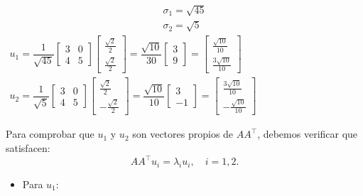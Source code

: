 \begin{enumerate}[label=\color{red}\textbf{\arabic*)}]
\begin{enumerate}[label=\color{red}\textbf{\alph*)}]
        \[
        \begin{array}{l}
            \sigma_1=\sqrt{45}\\
            \sigma_2=\sqrt{5} 
        \end{array}
        \] 
        $\begin{array}{l}
            u_1=\dfrac{1}{\sqrt{45} }\begin{bmatrix} 
                3 & 0\\
                4 & 5
            \end{bmatrix} \begin{bmatrix} 
            \tfrac{\sqrt{2} }{2} \\ \tfrac{\sqrt{2} }{2}  
            \end{bmatrix} =\dfrac{\sqrt{10} }{30}\begin{bmatrix} 
            3\\9 
            \end{bmatrix} =\begin{bmatrix} 
            \tfrac{\sqrt{10} }{10} \\ \tfrac{3\sqrt{10} }{10}
            \end{bmatrix}\\
            u_2=\dfrac{1}{\sqrt{5} }\begin{bmatrix} 
                3 & 0\\ 4 & 5 
            \end{bmatrix} \begin{bmatrix} 
            \tfrac{\sqrt{2} }{2}\\ -\tfrac{\sqrt{2}}{2}   
            \end{bmatrix} =\dfrac{\sqrt{10} }{10}\begin{bmatrix} 
            3\\-1 
            \end{bmatrix} =\begin{bmatrix} 
            \tfrac{3\sqrt{10} }{10}\\ -\tfrac{\sqrt{10} }{10} 
            \end{bmatrix} 
        \end{array}$


    Para comprobar que $u_1$ y $u_2$ son vectores propios de $A A^\intercal$, debemos verificar que satisfacen: \[
    A A^\intercal u_i=\lambda_iu_i,\quad i=1,2.
    \] 
    \begin{itemize}[label=\textbullet]
        \item Para $u_1$: 


\end{itemize}
\end{enumerate}
\end{enumerate}
